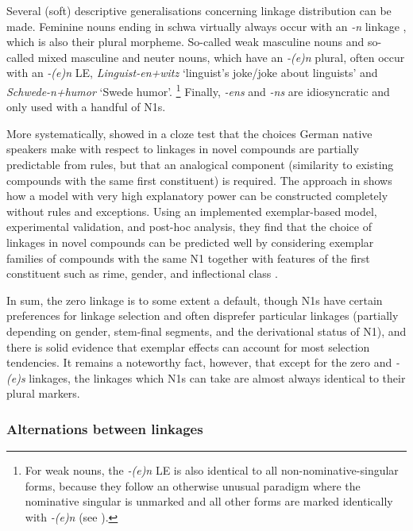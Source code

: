 Several (soft) descriptive generalisations concerning linkage distribution can be made.
Feminine nouns ending in schwa virtually always occur with an \textit{-n} linkage \parencite[32]{LibbenEa2002}, which is also their plural morpheme.
So-called weak masculine nouns and so-called mixed masculine and neuter nouns, which have an \textit{-(e)n} plural, often occur with an \textit{-(e)n} LE, \egg \textit{Linguist-en+witz} `linguist's joke\slash joke about linguists' and \textit{Schwede-n+humor} `Swede humor'.%
\footnote{For weak nouns, the \textit{-(e)n} LE is also identical to all non-nominative-singular forms, because they follow an otherwise unusual paradigm where the nominative singular is unmarked and all other forms are marked identically with \textit{-(e)n} (see \citealt{Koepcke1995,Schaefer2016c}).}
Finally, \textit{-ens} and \textit{-ns} are idiosyncratic and only used with a handful of N1s.

More systematically, \textcite{DresslerEa2001} showed in a cloze test that the choices German native speakers make with respect to linkages in novel compounds are partially predictable from rules, but that an analogical component (similarity to existing compounds with the same first constituent) is required.
The approach in \textcite{KrottEa2007} shows how a model with very high explanatory power can be constructed completely without rules and exceptions.
Using an implemented exemplar-based model, experimental validation, and post-hoc analysis, they find that the choice of linkages in novel compounds can be predicted well by considering exemplar families of compounds with the same N1 together with features of the first constituent such as rime, gender, and inflectional class \parencite[47]{KrottEa2007}.

In sum, the zero linkage is to some extent a default, though N1s have certain preferences for linkage selection and often disprefer particular linkages (partially depending on gender, stem-final segments, and the derivational status of N1), and there is solid evidence that exemplar effects can account for most selection tendencies.
It remains a noteworthy fact, however, that except for the zero and \textit{-(e)s} linkages, the linkages which N1s can take are almost always identical to their plural markers.

\subsubsection{Alternations between linkages}

